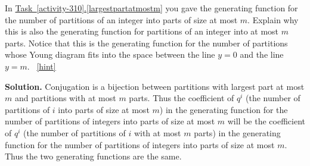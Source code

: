 \documentclass{book}
\begin{document}
\setcounter{project}{318}
\addtocounter{project}{-1}
\begin{activity}[]\label{atmostmparts}
\hypertarget{p-1640}{}%
In \hyperref[largestpartatmostm]{Task~\ref{activity-310}.\ref{largestpartatmostm}} you gave the generating function for the number of partitions of an integer into parts of size at most \(m\). Explain why this is also the generating function for partitions of an integer into at most \(m\) parts. Notice that this is the generating function for the number of partitions whose Young diagram fits into the space between the line \(y=0\) and the line \(y=m\).%
~\hfill{\tiny\hyperlink{a-318}{[hint]}\hypertarget{q-318}{}}\par\smallskip%
\noindent\textbf{Solution.}\hypertarget{solution-247}{}\quad%
\hypertarget{p-1642}{}%
Conjugation is a bijection between partitions with largest part at most \(m\) and partitions with at most \(m\) parts. Thus the coefficient of \(q^i\) (the number of partitions of \(i\) into parts of size at most \(m\)) in the generating function for the number of partitions of integers into parts of size at most \(m\) will be the coefficient of \(q^i\) (the number of partitions of \(i\) with at most \(m\) parts) in the generating function for the number of partitions of integers into parts of size at most \(m\). Thus the two generating functions are the same.%
\end{activity}
\end{document}
